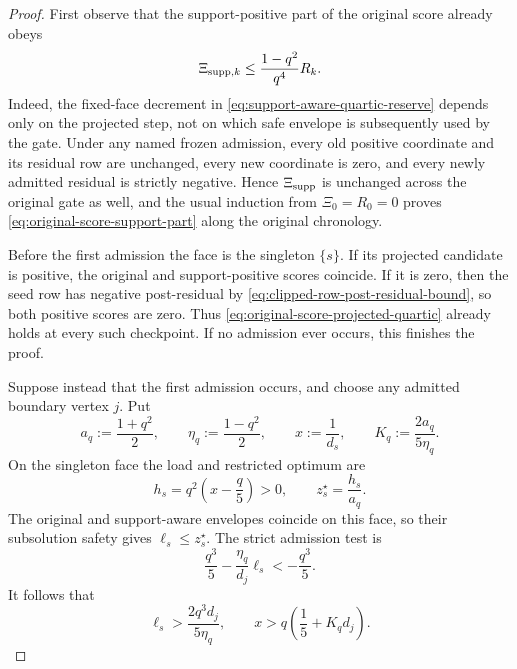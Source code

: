 \begin{proof}
First observe that the support-positive part of the original score already
obeys
\begin{equation}
 \Xi_{{\rm supp},k}
 \leq \frac{1-q^2}{q^4}R_k.
 \label{eq:original-score-support-part}
\end{equation}
Indeed, the fixed-face decrement in
\cref{eq:support-aware-quartic-reserve} depends only on the projected step,
not on which safe envelope is subsequently used by the gate.  Under any named
frozen admission, every old positive coordinate and its residual row are
unchanged, every new coordinate is zero, and every newly admitted residual
is strictly negative.  Hence $\Xi_{\rm supp}$ is unchanged across the
original gate as well, and the usual induction from $\Xi_0=R_0=0$ proves
\cref{eq:original-score-support-part} along the original chronology.

Before the first admission the face is the singleton $\{s\}$.  If its
projected candidate is positive, the original and support-positive scores
coincide.  If it is zero, then the seed row has negative post-residual by
\cref{eq:clipped-row-post-residual-bound}, so both positive scores are zero.
Thus \cref{eq:original-score-projected-quartic} already holds at every such
checkpoint.  If no admission ever occurs, this finishes the proof.

Suppose instead that the first admission occurs, and choose any admitted
boundary vertex $j$.  Put
\begin{equation*}
 a_q:=\frac{1+q^2}{2},
 \qquad \eta_q:=\frac{1-q^2}{2},
 \qquad x:=\frac1{d_s},
 \qquad K_q:=\frac{2a_q}{5\eta_q}.
\end{equation*}
On the singleton face the load and restricted optimum are
\begin{equation*}
 h_s=q^2\left(x-\frac q5\right)>0,
 \qquad z_s^\star=\frac{h_s}{a_q}.
\end{equation*}
The original and support-aware envelopes coincide on this face, so their
subsolution safety gives $\ell_s\leq z_s^\star$.  The strict admission test is
\begin{equation*}
 \frac{q^3}{5}-\frac{\eta_q}{d_j}\ell_s< -\frac{q^3}{5}.
\end{equation*}
It follows that
\begin{equation}
 \ell_s>\frac{2q^3d_j}{5\eta_q},
 \qquad
 x>q\left(\frac15+K_qd_j\right).
 \label{eq:first-admission-seed-floor}
\end{equation}


\end{proof}
